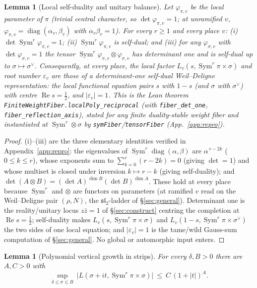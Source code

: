 \documentclass[11pt]{article}
\newtheorem{lemma}[theorem]{Lemma}
\theoremstyle{definition}
\renewcommand{\Re}{\operatorname{Re}}
\newcommand{\Sym}{\operatorname{Sym}}
\begin{document}
\begin{lemma}[Local self-duality and unitary balance]\label{lem:selfdual}
Let $\varphi_{\pi,v}$ be the local parameter of $\pi$ (trivial central character, so
$\det\varphi_{\pi,v}=1$; at unramified $v$, $\varphi_{\pi,v}=\operatorname{diag}(\alpha_v,\beta_v)$ with
$\alpha_v\beta_v=1$). For every $r\ge1$ and every place $v$: \textup{(i)} $\det\Sym^r\varphi_{\pi,v}=1$;
\textup{(ii)} $\Sym^r\varphi_{\pi,v}$ is self-dual; and \textup{(iii)} for any $\varphi_{\sigma,v}$ with
$\det\varphi_{\sigma,v}=1$ the tensor $\Sym^r\varphi_{\pi,v}\otimes\varphi_{\sigma,v}$ has determinant one
and is self-dual up to $\sigma\mapsto\sigma^\vee$. Consequently, at every place, the local factor
$L_v(s,\Sym^r\pi\times\sigma)$ and root number $\varepsilon_v$ are those of a determinant-one self-dual
Weil--Deligne representation: the local functional equation pairs $s$ with $1-s$ (and $\sigma$ with
$\sigma^\vee$) with centre $\Re s=\tfrac12$, and $|\varepsilon_v|=1$. This is the Lean theorem
\texttt{FiniteWeightFiber.localPoly\_reciprocal} (with \texttt{fiber\_det\_one},
\texttt{fiber\_reflection\_axis}), stated for any finite duality-stable weight fiber and instantiated at
$\Sym^r\otimes\sigma$ by \texttt{symFiber}/\texttt{tensorFiber} (App.~\ref{app:repro}).
\end{lemma}

\begin{proof}
\textup{(i)}--\textup{(iii)} are the three elementary identities verified in Appendix~\ref{app:repro}:
the eigenvalues of $\Sym^r\operatorname{diag}(\alpha,\beta)$ are $\alpha^{\,r-2k}$ ($0\le k\le r$), whose
exponents sum to $\sum_{k=0}^r(r-2k)=0$ (giving $\det=1$) and whose multiset is closed under inversion
$k\mapsto r-k$ (giving self-duality); and $\det(A\otimes B)=(\det A)^{\dim B}(\det B)^{\dim A}$. These hold
at every place because $\Sym^r$ and $\otimes$ are functors on parameters (at ramified $v$ read on the
Weil--Deligne pair $(\rho,N)$, the $\mathfrak{sl}_2$-ladder of \S\ref{sec:general}). Determinant one is the
reality/unitary locus $z\bar z=1$ of \S\ref{sec:construct} centring the completion at $\Re s=\tfrac12$;
self-duality makes $L_v(s,\Sym^r\pi\times\sigma)$ and $L_v(1-s,\Sym^r\pi\times\sigma^\vee)$ the two sides
of one local equation; and $|\varepsilon_v|=1$ is the tame/wild Gauss-sum computation of
\S\ref{sec:general}. No global or automorphic input enters.
\end{proof}

\begin{lemma}[Polynomial vertical growth in strips]\label{lem:bounded}
For every $\delta,B>0$ there are $A,C>0$ with
\[
  \sup_{\delta\le\sigma\le B}\ \bigl|L(\sigma+it,\Sym^r\pi\times\sigma)\bigr|\ \le\ C\,(1+|t|)^{A}.
\]
\end{lemma}
\end{document}
